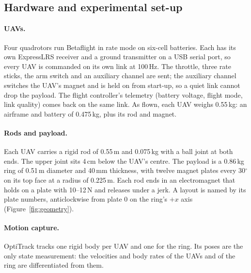 
\subsection{Hardware and experimental set-up}
\label{sec:hardware}

\paragraph{UAVs.} Four quadrotors run Betaflight in rate mode on six-cell batteries. Each has its own
ExpressLRS receiver and a ground transmitter on a USB serial port, so every UAV is commanded on its
own link at 100\,Hz. The throttle, three rate sticks, the arm switch and an auxiliary channel are
sent; the auxiliary channel switches the UAV's magnet and is held on from start-up, so a quiet link
cannot drop the payload. The flight controller's telemetry (battery voltage, flight mode, link
quality) comes back on the same link. As flown, each UAV weighs 0.55\,kg: an airframe and battery of
0.475\,kg, plus its rod and magnet.

\paragraph{Rods and payload.} Each UAV carries a rigid rod of 0.55\,m and 0.075\,kg with a ball joint
at both ends. The upper joint sits 4\,cm below the UAV's centre. The payload is a 0.86\,kg ring of
0.51\,m diameter and 40\,mm thickness, with twelve magnet plates every 30$^\circ$ on its top face at a
radius of 0.225\,m.
Each rod ends in an electromagnet that holds on a plate with 10--12\,N and releases under a jerk.
A layout is named by its plate numbers, anticlockwise from plate 0 on the ring's $+x$ axis
(Figure~\ref{fig:geometry}).



\paragraph{Motion capture.} OptiTrack tracks one rigid body per UAV and one for the ring. Its poses
are the only state measurement: the velocities and body rates of the UAVs and of the ring are
differentiated from them.


